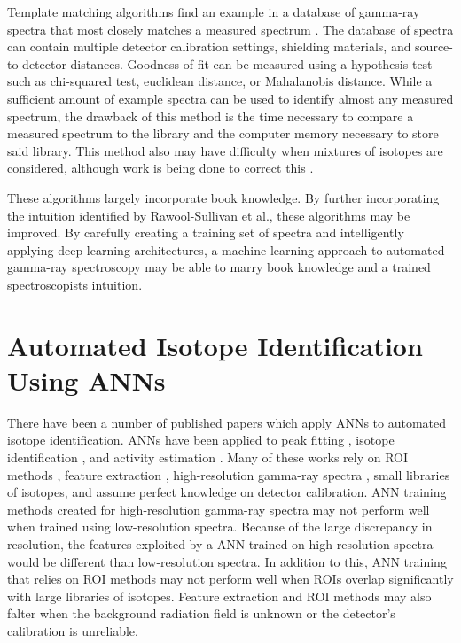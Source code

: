 Template matching algorithms find an example in a database of gamma-ray spectra that most closely matches a measured spectrum \cite{burr2009}. The database of spectra can contain multiple detector calibration settings, shielding materials, and source-to-detector distances. Goodness of fit can be measured using a hypothesis test such as chi-squared test, euclidean distance, or Mahalanobis distance. While a sufficient amount of example spectra can be used to identify almost any measured spectrum, the drawback of this method is the time necessary to compare a measured spectrum to the library and the computer memory necessary to store said library. This method also may have difficulty when mixtures of isotopes are considered, although work is being done to correct this \cite{mattingly2010}.

These algorithms largely incorporate book knowledge. By further incorporating the intuition identified by Rawool-Sullivan et al., these algorithms may be improved. By carefully creating a training set of spectra and intelligently applying deep learning architectures, a machine learning approach to automated gamma-ray spectroscopy may be able to marry book knowledge and a trained spectroscopists intuition.


\section{Automated Isotope Identification Using ANNs}

There have been a number of published papers which apply ANNs to automated isotope identification. ANNs have been applied to peak fitting \cite{Abdel-Aal2002}, isotope identification \cite{Abdel-Aal1996, Medhat2012}, and activity estimation \cite{Abdel-Aal1996, Vigneron1996}. Many of these works rely on ROI methods \cite{Pilato1999}, feature extraction \cite{Chen2009}, high-resolution gamma-ray spectra \cite{Yoshida2002}, small libraries of isotopes, and assume perfect knowledge on detector calibration. ANN training methods created for high-resolution gamma-ray spectra may not perform well when trained using low-resolution spectra. Because of the large discrepancy in resolution, the features exploited by a ANN trained on high-resolution spectra would be different than low-resolution spectra. In addition to this, ANN training that relies on ROI methods may not perform well when ROIs overlap significantly with large libraries of isotopes. Feature extraction and ROI methods may also falter when the background radiation field is unknown or the detector's calibration is unreliable.  

